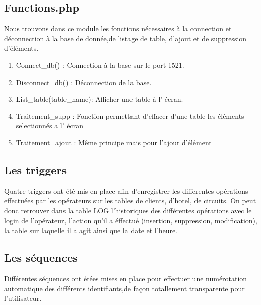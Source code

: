 \subsection{Functions.php}
Nous trouvons dans ce module les fonctions n\'ecessaires \`a la connection et d\'econnection \`a la base de donn\'ee,de listage de table, d'ajout et de suppression d'\'el\'ements.

\begin{enumerate}
\item Connect\_db() : Connection \`a la base sur le port 1521.
\item Disconnect\_db() : D\'econnection de la base.
\item List\_table(table\_name): Afficher une table \`a l' \'ecran.
\item Traitement\_supp : Fonction permettant d'effacer d'une table les \'el\'ements selectionn\'es a l' \'ecran
\item Traitement\_ajout : M\^eme principe mais pour l'ajour d'\'el\'ement
\end{enumerate}

\subsection{Les triggers}
Quatre triggers ont \'et\'e mis en place afin d'enregistrer les differentes op\'erations effectu\'ees par les op\'erateurs sur les tables de clients, d'hotel, de circuits.
On peut donc retrouver dans la table LOG l'historiques des diff\'erentes op\'erations avec le login de l'op\'erateur, l'action qu'il a \'effectu\'e (insertion, suppression, modification), la table sur laquelle il a agit ainsi que la date et l'heure.

\subsection{Les s\'equences}
Diff\'erentes s\'equences ont \'et\'ees mises en place pour effectuer une num\'erotation automatique des diff\'erents identifiants,de façon totallement transparente pour l'utilisateur.



\normalsize



\newpage